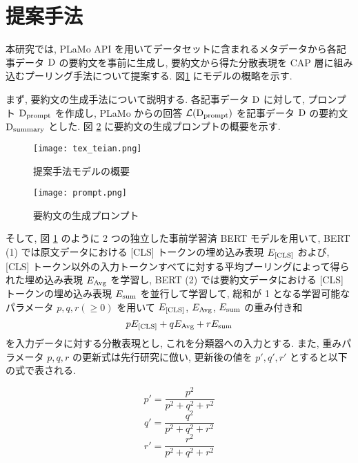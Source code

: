 \documentclass[twocolumn]{jarticle}
\begin{document}
\section{提案手法}
本研究では, PLaMo API を用いてデータセットに含まれるメタデータから各記事データ $\rm{D}$ の要約文を事前に生成し, 要約文から得た分散表現を CAP 層に組み込むプーリング手法について提案する. 図\ref{fig:2_teian} にモデルの概略を示す.

まず, 要約文の生成手法について説明する. 各記事データ $\rm{D}$ に対して, プロンプト $\rm{D_{\rm{prompt}}}$ を作成し, PLaMo からの回答 $\mathcal{L}(\rm{D_{\rm{prompt}}})$ を記事データ $\rm{D}$ の要約文 $\rm{D_{\rm{summary}}}$ とした. 図 \ref{fig:3_prompt} に要約文の生成プロンプトの概要を示す.

\begin{figure}[h]
  \begin{center}
    \texttt{[image: tex\_teian.png]}
    \caption{提案手法モデルの概要} %
    \label{fig:2_teian} %
  \end{center}
\end{figure}

\begin{figure}[h]
  \begin{center}
    \texttt{[image: prompt.png]}
    \caption{要約文の生成プロンプト} %
    \label{fig:3_prompt} %
  \end{center}
\end{figure}

そして, 図 \ref{fig:2_teian} のように 2 つの独立した事前学習済 BERT モデルを用いて, BERT (1) では原文データにおける [CLS] トークンの埋め込み表現 $E_{\rm{[CLS]}}$ および, [CLS] トークン以外の入力トークンすべてに対する平均プーリングによって得られた埋め込み表現 $E_{\rm{Avg}}$ を学習し, BERT (2) では要約文データにおける [CLS] トークンの埋め込み表現 $E_{\rm{sum}}$ を並行して学習して, 総和が 1 となる学習可能なパラメータ $p, q, r (\geq0)$ を用いて $E_{\rm{[CLS]}}$, $E_{\rm{Avg}}$, $E_{\rm{sum}}$ の重み付き和
\begin{equation}
  pE_{\rm{[CLS]}}+qE_{\rm{Avg}}+rE_{\rm{sum}}
\end{equation}
を入力データに対する分散表現とし, これを分類器への入力とする. また, 重みパラメータ $p, q, r$ の更新式は先行研究に倣い, 更新後の値を $p', q', r'$ とすると以下の式で表される.

\begin{equation}
  p' = \frac{p^{2}}{p^{2}+q^{2}+r^{2}}
\end{equation}
\begin{equation}
  q' = \frac{q^{2}}{p^{2}+q^{2}+r^{2}}
\end{equation}
\begin{equation}
  r' = \frac{r^{2}}{p^{2}+q^{2}+r^{2}}
\end{equation}
\end{document}
